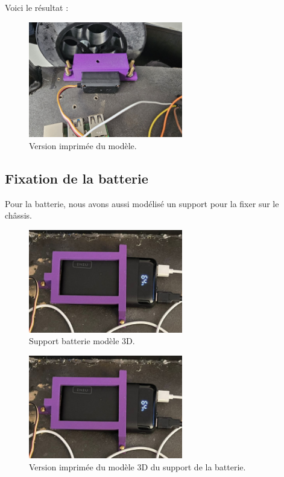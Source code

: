 \documentclass[a4paper,12pt]{report}  %
\begin{document}
Voici le résultat : 

\begin{figure}[H]
	\centering
	\includegraphics[width=0.6\textwidth]{./attachments/servomoteur-roues_impression.jpg}
	\caption{Version imprimée du modèle.}
\end{figure}

\subsection{Fixation de la batterie}
Pour la batterie, nous avons aussi modélisé un support pour la fixer sur le châssis.

\begin{figure}[H]
	\centering
	\includegraphics[width=0.6\textwidth]{./attachments/support_batterie_impression.png}
	\caption{Support batterie modèle 3D.}
\end{figure}

\begin{figure}[H]
	\centering
	\includegraphics[width=0.6\textwidth]{./attachments/support_batterie_impression.png}
	\caption{Version imprimée du modèle 3D du support de la batterie.}
\end{figure}
\end{document}
